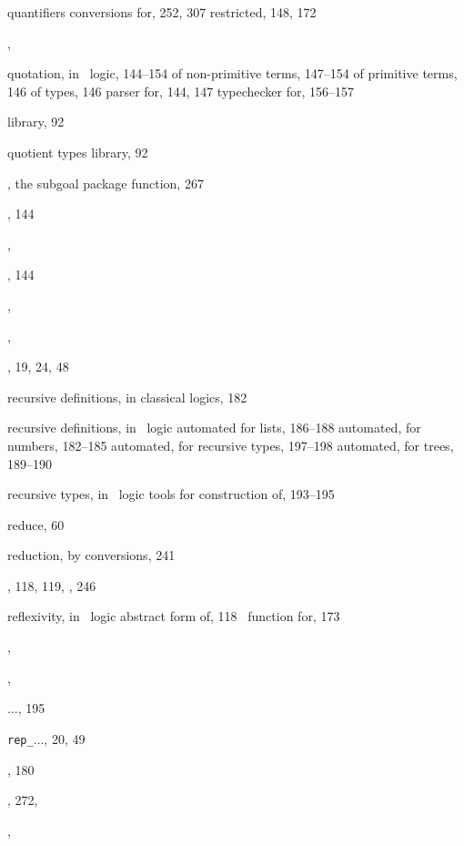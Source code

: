 \begin{theindex}
  \indexspace

  \item quantifiers
    \subitem conversions for, 252, 307
    \subitem restricted, 148, 172
  \item {}, 
  \item quotation, in \HOL\ logic, 144--154
    \subitem of non-primitive terms, 147--154
    \subitem of primitive terms, 146
    \subitem of types, 146
    \subitem parser for, 144, 147
    \subitem typechecker for, 156--157
  \item {} library, 92
  \item quotient types library, 92

  \indexspace

  \item {}, the subgoal package function, 267
  \item {}, 144
  \item {}, 
  \item {}, 144
  \item {}, 
  \item {}, 
  \item {}, 19, 24, 48
  \item recursive definitions, in classical logics, 182
  \item recursive definitions, in \HOL\ logic
    \subitem automated for lists, 186--188
    \subitem automated, for numbers, 182--185
    \subitem automated, for recursive types, 197--198
    \subitem automated, for trees, 189--190
  \item recursive types, in \HOL\ logic
    \subitem tools for construction of, 193--195
  \item reduce, 60
  \item reduction, by conversions, 241
  \item {}, 118, 119, , 246
  \item reflexivity, in \HOL\ logic
    \subitem abstract form of, 118
    \subitem \ML\ function for, 173
  \item {}, 
  \item {}, 
  \item {}$\ldots$, 195
  \item {\small\verb+rep_+$\ldots$}, 20, 49
  \item {}, 180
  \item {}, 272, 
  \item {}, 

\end{theindex}
